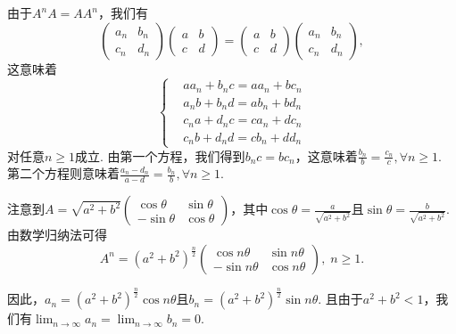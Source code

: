 \setcounter{solution}{17}

\begin{solution}
  由于$A^nA=AA^n$，我们有
  \[
    \begin{pmatrix}
      a_n & b_n \\
      c_n & d_n
    \end{pmatrix}\begin{pmatrix}
      a & b \\
      c & d
    \end{pmatrix} = \begin{pmatrix}
      a & b \\
      c & d
    \end{pmatrix}\begin{pmatrix}
      a_n & b_n \\
      c_n & d_n
    \end{pmatrix},
  \]
  这意味着
  \[
    \left\{
      \begin{aligned}
        & aa_n + b_nc = aa_n + bc_n \\
        & a_nb + b_nd = ab_n + bd_n \\
        & c_na + d_nc = ca_n + dc_n \\
        & c_nb + d_nd = cb_n + dd_n
      \end{aligned}
    \right.
  \]
  对任意$n\ge1$成立. 由第一个方程，我们得到$b_nc=bc_n$，这意味着$\frac{b_n}b=\frac{c_n}c,\forall n\ge1$. 第二个方程则意味着$\frac{a_n-d_n}{a-d}=\frac{b_n}b,\forall n\ge1$.

\end{solution}

\begin{solution}
  注意到$A=\sqrt{a^2+b^2}\begin{pmatrix}
    \cos\theta & \sin\theta \\
    -\sin\theta & \cos \theta
  \end{pmatrix}$，其中$\cos\theta=\frac a{\sqrt{a^2+b^2}}$且$\sin \theta=\frac b{\sqrt{a^2+b^2}}$. 由数学归纳法可得
  \[
    A^n = (a^2 + b^2)^{\frac n2}\begin{pmatrix}
      \cos n\theta & \sin n\theta \\
      -\sin n\theta & \cos n\theta
    \end{pmatrix},\; n\ge1.
  \]

  因此，$a_n=(a^2+b^2)^{\frac n2}\cos n\theta$且$b_n=(a^2+b^2)^{\frac n2}\sin n\theta$. 且由于$a^2+b^2<1$，我们有$\lim_{n\to\infty}a_n=\lim_{n\to\infty}b_n=0$.
\end{solution}

